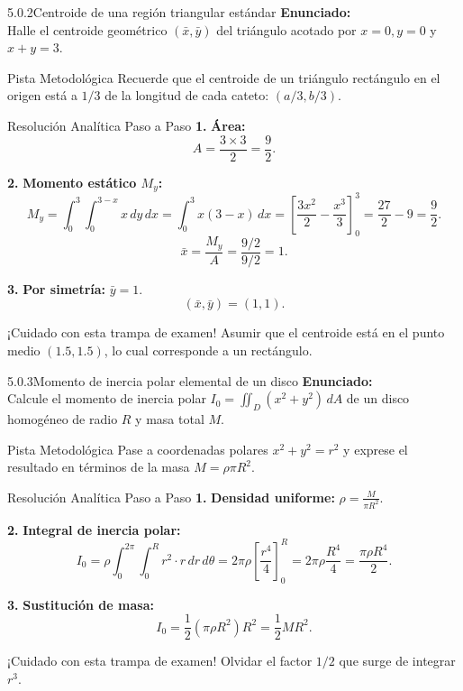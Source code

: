 \documentclass[11pt,a4paper]{article}
\begin{document}
\begin{nivelbox}{5.0.2}{Centroide de una región triangular estándar}
\textbf{Enunciado:}\\
Halle el centroide geométrico $(\bar{x}, \bar{y})$ del triángulo acotado por $x = 0, y = 0$ y $x + y = 3$.

\begin{observacionbox}{Pista Metodológica}
Recuerde que el centroide de un triángulo rectángulo en el origen está a $1/3$ de la longitud de cada cateto: $(a/3, b/3)$.
\end{observacionbox}

\begin{ejerciciobox}{Resolución Analítica Paso a Paso}
\smallskip\noindent\textbf{1.} \textbf{Área:}
\[A = \frac{3 \times 3}{2} = \frac{9}{2}.\]

\smallskip\noindent\textbf{2.} \textbf{Momento estático $M_y$:}
\[M_y = \int_0^3 \int_0^{3-x} x \, dy \, dx = \int_0^3 x(3 - x) \, dx = \left[ \frac{3x^2}{2} - \frac{x^3}{3} \right]_0^3 = \frac{27}{2} - 9 = \frac{9}{2}.\]
\[\bar{x} = \frac{M_y}{A} = \frac{9/2}{9/2} = 1.\]

\smallskip\noindent\textbf{3.} \textbf{Por simetría:} $\bar{y} = 1$.
\[(\bar{x}, \bar{y}) = (1, 1).\]
\end{ejerciciobox}

\begin{errorbox}{¡Cuidado con esta trampa de examen!}
Asumir que el centroide está en el punto medio $(1.5, 1.5)$, lo cual corresponde a un rectángulo.
\end{errorbox}
\end{nivelbox}
\bigskip

\begin{nivelbox}{5.0.3}{Momento de inercia polar elemental de un disco}
\textbf{Enunciado:}\\
Calcule el momento de inercia polar $I_0 = \iint_D (x^2 + y^2) \, dA$ de un disco homogéneo de radio $R$ y masa total $M$.

\begin{observacionbox}{Pista Metodológica}
Pase a coordenadas polares $x^2+y^2 = r^2$ y exprese el resultado en términos de la masa $M = \rho \pi R^2$.
\end{observacionbox}

\begin{ejerciciobox}{Resolución Analítica Paso a Paso}
\smallskip\noindent\textbf{1.} \textbf{Densidad uniforme:} $\rho = \frac{M}{\pi R^2}$.

\smallskip\noindent\textbf{2.} \textbf{Integral de inercia polar:}
\[I_0 = \rho \int_0^{2\pi} \int_0^R r^2 \cdot r \, dr \, d\theta = 2\pi \rho \left[ \frac{r^4}{4} \right]_0^R = 2\pi \rho \frac{R^4}{4} = \frac{\pi \rho R^4}{2}.\]

\smallskip\noindent\textbf{3.} \textbf{Sustitución de masa:}
\[I_0 = \frac{1}{2} (\pi \rho R^2) R^2 = \frac{1}{2} M R^2.\]
\end{ejerciciobox}

\begin{errorbox}{¡Cuidado con esta trampa de examen!}
Olvidar el factor $1/2$ que surge de integrar $r^3$.
\end{errorbox}
\end{nivelbox}
\bigskip
\end{document}
